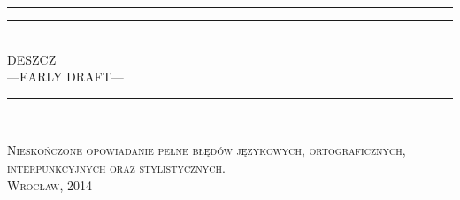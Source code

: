\documentclass[9pt,openany,titlepage]{extbook}
\begin{document}
	\begin{titlepage}
		\centering
		\vspace*{\baselineskip}
		\rule{\textwidth}{1.6pt}\vspace*{-\baselineskip}\vspace*{2pt}
		\rule{\textwidth}{0.4pt}\\[\baselineskip]{
			\LARGE DESZCZ \\[0.3\baselineskip] ---EARLY DRAFT---
		}\\[0.2\baselineskip]
		\rule{\textwidth}{0.4pt}\vspace*{-\baselineskip}\vspace{3.2pt}
		\rule{\textwidth}{1.6pt}\\[\baselineskip]
		\scshape
		Nieskończone opowiadanie pełne błędów językowych, ortograficznych, \\
		interpunkcyjnych oraz stylistycznych. \\[\baselineskip] 
		\vspace*{2\baselineskip}
		\vfill{\scshape Wrocław, 2014} \\[0.3\baselineskip]
	\end{titlepage}
	\thispagestyle{empty}
	\cleardoublepage
\end{document}
